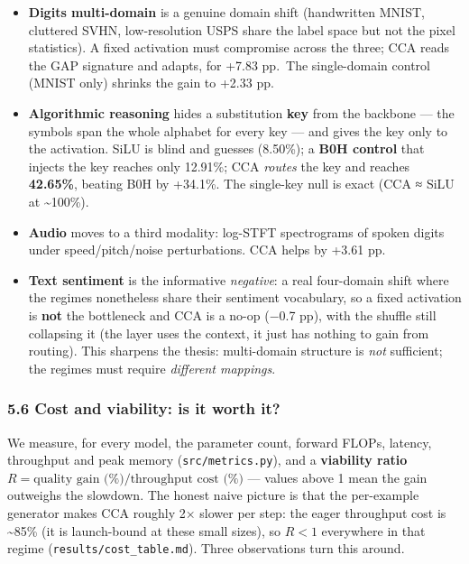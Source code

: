 \documentclass[
  11pt,
]{article}
\newcounter{none} %
\providecommand{\tightlist}{%
  \setlength{\itemsep}{0pt}\setlength{\parskip}{0pt}}
\begin{document}
\begin{itemize}
\tightlist
\item
  \textbf{Digits multi-domain} is a genuine domain shift (handwritten
  MNIST, cluttered SVHN, low-resolution USPS share the label space but
  not the pixel statistics). A fixed activation must compromise across
  the three; CCA reads the GAP signature and adapts, for +7.83 pp.~The
  single-domain control (MNIST only) shrinks the gain to +2.33 pp.
\item
  \textbf{Algorithmic reasoning} hides a substitution \textbf{key} from
  the backbone --- the symbols span the whole alphabet for every key ---
  and gives the key only to the activation. SiLU is blind and guesses
  (8.50\%); a \textbf{B0H control} that injects the key reaches only
  12.91\%; CCA \emph{routes} the key and reaches \textbf{42.65\%},
  beating B0H by +34.1\%. The single-key null is exact (CCA ≈ SiLU at
  \textasciitilde100\%).
\item
  \textbf{Audio} moves to a third modality: log-STFT spectrograms of
  spoken digits under speed/pitch/noise perturbations. CCA helps by
  +3.61 pp.
\item
  \textbf{Text sentiment} is the informative \emph{negative}: a real
  four-domain shift where the regimes nonetheless share their sentiment
  vocabulary, so a fixed activation is \textbf{not} the bottleneck and
  CCA is a no-op (−0.7 pp), with the shuffle still collapsing it (the
  layer uses the context, it just has nothing to gain from routing).
  This sharpens the thesis: multi-domain structure is \emph{not}
  sufficient; the regimes must require \emph{different mappings}.
\end{itemize}

\subsubsection{5.6 Cost and viability: is it worth
it?}\label{cost-and-viability-is-it-worth-it}

We measure, for every model, the parameter count, forward FLOPs,
latency, throughput and peak memory (\texttt{src/metrics.py}), and a
\textbf{viability ratio}
\(R = \text{quality gain (\%)} / \text{throughput cost (\%)}\) ---
values above 1 mean the gain outweighs the slowdown. The honest naive
picture is that the per-example generator makes CCA roughly 2× slower
per step: the eager throughput cost is \textasciitilde85\% (it is
launch-bound at these small sizes), so \(R<1\) everywhere in that regime
(\texttt{results/cost\_table.md}). Three observations turn this around.
\end{document}
